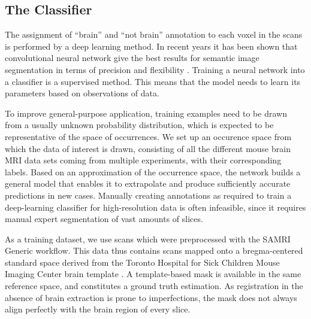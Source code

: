 \subsection{The Classifier} \label{sec:Convolutional Neural Networks}
The assignment of “brain” and “not brain” annotation to each voxel in the scans is performed by a deep learning method.
In recent years it has been shown that convolutional neural network give the best results for semantic image segmentation in terms of precision and flexibility \cite{geng_survey_2018, ronneberger_u-net:_2015}.
Training a neural network into a classifier is a supervised method.
This means that the model needs to learn its parameters based on observations of data.

To improve general-purpose application, training examples need to be drawn from a usually unknown probability distribution, which is expected to be representative of the space of occurrences.
We set up an occurence space from which the data of interest is drawn, consisting of all the different mouse brain MRI data sets coming from multiple experiments, with their corresponding labels.
Based on an approximation of the occurrence space, the network builds a general model that enables it to extrapolate and produce sufficiently accurate predictions in new cases.
Manually creating annotations as required to train a deep-learning classifier for high-resolution data is often infeasible, since it requires manual expert segmentation of vast amounts of slices.

As a training dataset, we use scans which were preprocessed with the SAMRI Generic workflow.
This data thus contains scans mapped onto a bregma-centered standard \cite{ioanas_optimized_2019} space derived from the Toronto Hospital for Sick Children Mouse Imaging Center brain template \cite{dsu}.
A template-based mask is available in the same reference space, and constitutes a ground truth estimation.
As registration in the absence of brain extraction is prone to imperfections, the mask does not always align perfectly with the brain region of every slice.

